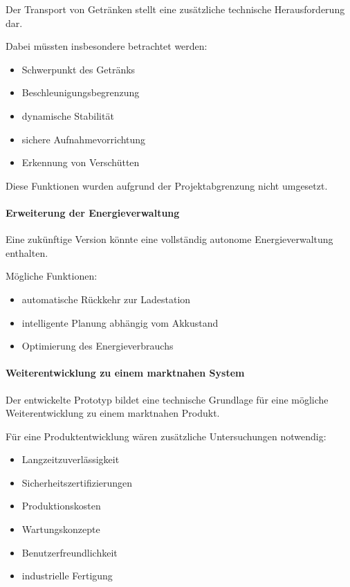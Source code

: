 \documentclass[
  a4paper,
  12pt,
  DIV=12,        %
  parskip=half,  %
  headings=small %
]{scrartcl}
\theoremstyle{definition}
\providecommand{\tightlist}{%
  \setlength{\itemsep}{0pt}\setlength{\parskip}{0pt}}
\theoremstyle{definition}
\begin{document}
Der Transport von Getränken stellt eine zusätzliche technische
Herausforderung dar.

Dabei müssten insbesondere betrachtet werden:

\begin{itemize}
\tightlist
\item
  Schwerpunkt des Getränks
\item
  Beschleunigungsbegrenzung
\item
  dynamische Stabilität
\item
  sichere Aufnahmevorrichtung
\item
  Erkennung von Verschütten
\end{itemize}

Diese Funktionen wurden aufgrund der Projektabgrenzung nicht umgesetzt.

\paragraph{Erweiterung der
Energieverwaltung}\label{erweiterung-der-energieverwaltung}

Eine zukünftige Version könnte eine vollständig autonome
Energieverwaltung enthalten.

Mögliche Funktionen:

\begin{itemize}
\tightlist
\item
  automatische Rückkehr zur Ladestation
\item
  intelligente Planung abhängig vom Akkustand
\item
  Optimierung des Energieverbrauchs
\end{itemize}

\paragraph{Weiterentwicklung zu einem marktnahen
System}\label{weiterentwicklung-zu-einem-marktnahen-system}

Der entwickelte Prototyp bildet eine technische Grundlage für eine
mögliche Weiterentwicklung zu einem marktnahen Produkt.

Für eine Produktentwicklung wären zusätzliche Untersuchungen notwendig:

\begin{itemize}
\tightlist
\item
  Langzeitzuverlässigkeit
\item
  Sicherheitszertifizierungen
\item
  Produktionskosten
\item
  Wartungskonzepte
\item
  Benutzerfreundlichkeit
\item
  industrielle Fertigung
\end{itemize}
\end{document}
